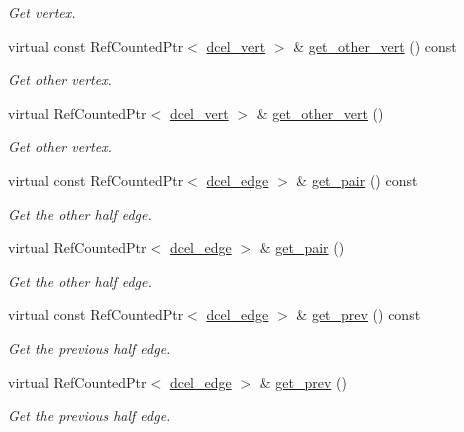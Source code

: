 \begin{DoxyCompactItemize}
\begin{DoxyCompactList}\small\item\em Get vertex. \end{DoxyCompactList}\item 
virtual const Ref\+Counted\+Ptr$<$ \hyperlink{classdcel__vert}{dcel\+\_\+vert} $>$ \& \hyperlink{classdcel__edge_a34913e7f8996eaf6bbfbd8fd0ca85fef}{get\+\_\+other\+\_\+vert} () const 
\begin{DoxyCompactList}\small\item\em Get other vertex. \end{DoxyCompactList}\item 
virtual Ref\+Counted\+Ptr$<$ \hyperlink{classdcel__vert}{dcel\+\_\+vert} $>$ \& \hyperlink{classdcel__edge_a88308d8ca4d06fac08c56642cbfae96a}{get\+\_\+other\+\_\+vert} ()
\begin{DoxyCompactList}\small\item\em Get other vertex. \end{DoxyCompactList}\item 
virtual const Ref\+Counted\+Ptr$<$ \hyperlink{classdcel__edge}{dcel\+\_\+edge} $>$ \& \hyperlink{classdcel__edge_afe4d7c0659f545e042ed610d0fd0c616}{get\+\_\+pair} () const 
\begin{DoxyCompactList}\small\item\em Get the other half edge. \end{DoxyCompactList}\item 
virtual Ref\+Counted\+Ptr$<$ \hyperlink{classdcel__edge}{dcel\+\_\+edge} $>$ \& \hyperlink{classdcel__edge_a058f603ed8cd5981fbcdbc7c28b9da7f}{get\+\_\+pair} ()
\begin{DoxyCompactList}\small\item\em Get the other half edge. \end{DoxyCompactList}\item 
virtual const Ref\+Counted\+Ptr$<$ \hyperlink{classdcel__edge}{dcel\+\_\+edge} $>$ \& \hyperlink{classdcel__edge_a24095ab3967b4932de94d376b653e749}{get\+\_\+prev} () const 
\begin{DoxyCompactList}\small\item\em Get the previous half edge. \end{DoxyCompactList}\item 
virtual Ref\+Counted\+Ptr$<$ \hyperlink{classdcel__edge}{dcel\+\_\+edge} $>$ \& \hyperlink{classdcel__edge_a66652ca4333ebf46645387c282e9f40e}{get\+\_\+prev} ()
\begin{DoxyCompactList}\small\item\em Get the previous half edge. \end{DoxyCompactList}\item 

\end{DoxyCompactItemize}
